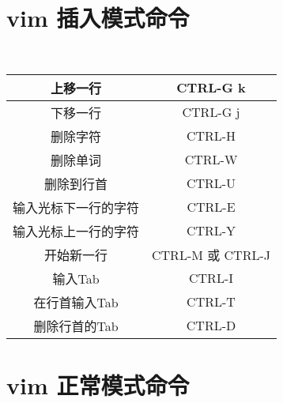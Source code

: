 \documentclass{article}
\begin{document}
\section{vim 插入模式命令}
\begin{table}[h!]
  \center\tt
  \begin{tabular}{|c|c|}
    \hline
    上移一行             &  CTRL-G k\\  \hline
    下移一行             &  CTRL-G j      \\  \hline
    删除字符             &  CTRL-H      \\  \hline
    删除单词             &  CTRL-W\\  \hline
    删除到行首           &  CTRL-U    \\  \hline
    输入光标下一行的字符 &  CTRL-E\\  \hline
    输入光标上一行的字符 &  CTRL-Y\\  \hline
    开始新一行           &  CTRL-M 或 CTRL-J\\  \hline
    输入Tab              &  CTRL-I\\  \hline
    在行首输入Tab        &  CTRL-T\\  \hline
    删除行首的Tab        &  CTRL-D  \\  \hline
  \end{tabular}
\end{table}
\section{vim 正常模式命令}
\end{document}
